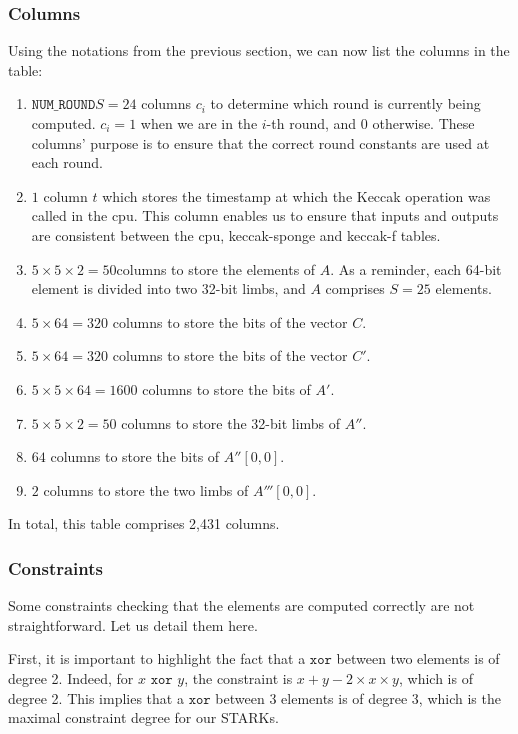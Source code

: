 \subsubsection{Columns}
Using the notations from the previous section, we can now list the columns in the table:
\begin{enumerate}
    \item $\texttt{NUM\_ROUND}S = 24$ columns $c_i$ to determine which round is currently being computed. $c_i = 1$ when we are in the $i$-th round, and 0 otherwise. These columns' purpose is to ensure that the correct round constants are used at each round.
    \item $1$ column $t$ which stores the timestamp at which the Keccak operation was called in the cpu. This column enables us to ensure that inputs and outputs are consistent between the cpu, keccak-sponge and keccak-f tables.
    \item $5 \times 5 \times 2 = 50 $columns to store the elements of $A$. As a reminder, each 64-bit element is divided into two 32-bit limbs, and $A$ comprises $S = 25$ elements.
    \item $5 \times 64 = 320$ columns to store the bits of the vector $C$.
    \item $5 \times 64 = 320$ columns to store the bits of the vector $C'$.
    \item $5 \times 5 \times 64 = 1600$ columns to store the bits of $A'$.
    \item $5 \times 5 \times 2 = 50$ columns to store the 32-bit limbs of $A''$.
    \item $64$ columns to store the bits of $A''[0, 0]$.
    \item $2$ columns to store the two limbs of $A'''[0, 0]$.
\end{enumerate}

In total, this table comprises 2,431 columns.

\subsubsection{Constraints}
Some constraints checking that the elements are computed correctly are not straightforward. Let us detail them here.

First, it is important to highlight the fact that a $\texttt{xor}$ between two elements is of degree 2. Indeed, for $x \texttt{ xor } y$, the constraint is $x + y - 2 \times x \times y$, which is of degree 2. This implies that a $\texttt{xor}$ between 3 elements is of degree 3, which is the maximal constraint degree for our STARKs.

